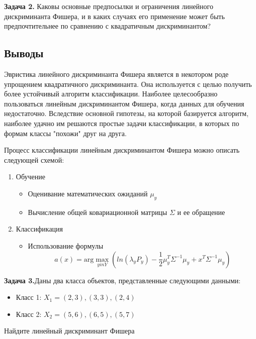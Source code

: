 \textbf{Задача 2.} Каковы основные предпосылки и ограничения линейного дискриминанта Фишера, и в каких случаях его применение может быть предпочтительнее по сравнению с квадратичным дискриминантом?

\subsection*{Выводы}

Эвристика линейного дискриминанта Фишера является в некотором роде упрощением квадратичного дискриминанта. Она используется с целью получить более устойчивый алгоритм классификации. Наиболее целесообразно пользоваться линейным дискриминантом Фишера, когда данных для обучения недостаточно. Вследствие основной гипотезы, на которой базируется алгоритм, наиболее удачно им решаются простые задачи классификации, в которых по формам классы "похожи" друг на друга.

Процесс классификации линейным дискриминантом Фишера можно описать следующей схемой:
\begin{enumerate}
    \item Обучение
    \begin{itemize}
        \item Оценивание математических ожиданий $\mu_y$
        \item Вычисление общей ковариационной матрицы $\Sigma$ и ее обращение
    \end{itemize}

    \item Классификация
    \begin{itemize}
        \item Использование формулы
        \[
        a(x) = \mathrm{arg}\max_{yin Y} \left( ln(\lambda_{y} P_y) - \frac{1}{2}\mu_{y}^{T} \Sigma^{-1} \mu_y + x^T \Sigma^{-1} \mu_y \right)
        \]
    \end{itemize}
\end{enumerate}

\textbf{Задача 3.}Даны два класса объектов, представленные следующими данными:

\begin{itemize}
    \item Класс 1: $X_1 = {(2, 3), (3, 3), (2, 4)}$
    \item Класс 2: $X_2 = {(5, 6), (6, 5), (5, 7)}$
\end{itemize}

Найдите линейный дискриминант Фишера
\newline

